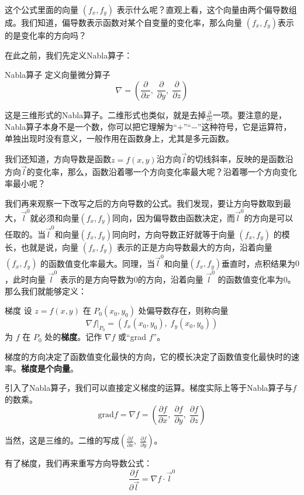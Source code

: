 这个公式里面的向量 $(f_x, f_y)$ 表示什么呢？直观上看，这个向量由两个偏导数组成。我们知道，偏导数表示函数对某个自变量的变化率，那么向量 $(f_x, f_y)$表示的是变化率的方向吗？

在此之前，我们先定义Nabla算子：

\begin{definition}{Nabla算子}{}
  定义向量微分算子
\[
\nabla = (\frac{\partial}{\partial x},\; \frac{\partial}{\partial y},\; \frac{\partial}{\partial z})
\]
\end{definition}

这是三维形式的Nabla算子。二维形式也类似，就是去掉$\frac{\partial}{\partial z}$一项。要注意的是，Nabla算子本身不是一个数，你可以把它理解为“$+$”“$-$”这种符号，它是运算符，单独出现时没有意义，一般作用在函数身上，尤其是多元函数。

我们还知道，方向导数是函数$z=f(x,y)$沿方向$\vec{l}$的切线斜率，反映的是函数沿方向$\vec{l}$的变化率，那么，函数沿着哪一个方向变化率最大呢？沿着哪一个方向变化率最小呢？

我们再来观察一下改写之后的方向导数的公式。我们发现，要让方向导数取到最大，$\vec{l}^0$就必须和向量$(f_x, f_y)$同向，因为偏导数由函数决定，而$\vec{l}^0$的方向是可以任取的。当$\vec{l}^0$和向量$(f_x, f_y)$同向时，方向导数正好就等于向量 $(f_x, f_y)$ 的模长，也就是说，向量 $(f_x, f_y)$ 表示的正是方向导数最大的方向，沿着向量 $(f_x, f_y)$ 的函数值变化率最大。同理，当$\vec{l}^0$和向量$(f_x, f_y)$垂直时，点积结果为$0$，此时向量 $\vec{l}^0$ 表示的是方向导数为$0$的方向，沿着向量 $\vec{l}^0$ 的函数值变化率为$0$。那么我们就能够定义：

\begin{definition}{梯度}{}
设 $z = f(x, y)$ 在 $P_0(x_0, y_0)$ 处偏导数存在，则称向量
\[
\nabla f\big|_{P_0} = (f_x(x_0, y_0),\; f_y(x_0, y_0))
\]
为 $f$ 在 $P_0$ 处的\textbf{梯度}。记作 $\nabla f$ 或“grad $f$”。
\end{definition}

梯度的方向决定了函数值变化最快的方向，它的模长决定了函数值变化最快时的速率。\textbf{梯度是个向量}。

引入了Nabla算子，我们可以直接定义梯度的运算。梯度实际上等于Nabla算子与$f$的数乘。
\[
\text{grad} f=\nabla f= (\frac{\partial f}{\partial x},\; \frac{\partial f}{\partial y},\; \frac{\partial f}{\partial z})
\]

当然，这是三维的。二维的写成$(\frac{\partial f}{\partial x},\; \frac{\partial f}{\partial y})$。

有了梯度，我们再来重写方向导数公式：
\[
\frac{\partial f}{\partial \vec{l}}=\nabla f \cdot \vec{l}^0
\]


